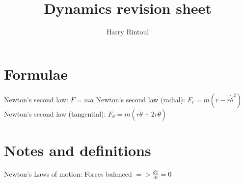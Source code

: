 \documentclass{article}
\title{Dynamics revision sheet}
\author{Harry Rintoul}
\date{}
\begin{document}
\maketitle


\section{Formulae}
\begin{multicols}{2}
Newton's second law: $F = ma$
\newline
Newton's second law (radial): $ F_r = m(\ddot{r} -r \dot{\theta}^2)$
\newline
Newton's second law (tangential): $F_{\theta} = m(r\ddot{\theta}+2\dot{r}\dot{\theta})$
\newline

\end{multicols}


\section{Notes and definitions}
Newton's Laws of motion:
\newline
Forces balanced $=>\frac{dx}{dt} = 0$
\end{document}

